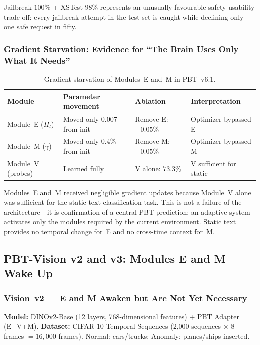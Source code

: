 \documentclass[12pt,a4paper]{article}
\begin{document}
Jailbreak $100\%$ + XSTest $98\%$ represents an unusually favourable
safety-usability trade-off: every jailbreak attempt in the test set is caught
while declining only one safe request in fifty.

\subsubsection{Gradient Starvation: Evidence for ``The Brain Uses Only What It
Needs''}

\begin{table}[ht]
\centering
\caption{Gradient starvation of Modules~E and~M in PBT~v6.1.}
\label{tab:gradient_starv}
\small
\begin{tabular}{@{}L{3.0cm}L{3.5cm}L{3.0cm}L{3.5cm}@{}}
\toprule
\textbf{Module} & \textbf{Parameter movement}
  & \textbf{Ablation} & \textbf{Interpretation} \\
\midrule
Module~E ($\Pi_l$) & Moved only $0.007$ from init &
  Remove E: $-0.05\%$ & Optimizer bypassed E \\
Module~M ($\gamma$) & Moved only $0.4\%$ from init &
  Remove M: $-0.05\%$ & Optimizer bypassed M \\
Module~V (probes) & Learned fully &
  V alone: $73.3\%$ & V sufficient for static \\
\bottomrule
\end{tabular}
\end{table}

Modules~E and~M received negligible gradient updates because Module~V alone
was sufficient for the static text classification task. This is not a failure
of the architecture---it is confirmation of a central PBT prediction: an
adaptive system activates only the modules required by the current environment.
Static text provides no temporal change for~E and no cross-time context for~M.

\subsection{PBT-Vision v2 and v3: Modules E and M Wake Up}

\subsubsection{Vision~v2 --- E and M Awaken but Are Not Yet Necessary}

\textbf{Model:} DINOv2-Base \citep{oquab2023}
(12 layers, 768-dimensional features) + PBT Adapter (E+V+M).
\textbf{Dataset:} CIFAR-10 Temporal Sequences
(2,000 sequences $\times$ 8 frames $= 16{,}000$ frames).
Normal: cars/trucks; Anomaly: planes/ships inserted.
\end{document}

